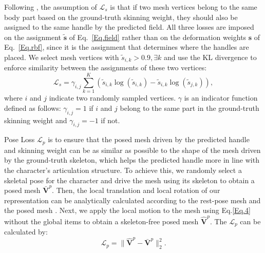 \documentclass[lettersize,journal]{IEEEtran}
\begin{document}
Following \cite{liao2022skeleton}, the assumption of $\mathcal{L}_s$ is that if two mesh vertices belong to the same body part based on the ground-truth skinning weight, they should also be assigned to the same handle by the predicted field. All three losses are imposed on the assignment $\tilde{\bm{s}}$ of Eq.~\ref{Eq.field} rather than on the deformation weights $\bm{s}$ of Eq.~\ref{Eq.rbf}, since it is the assignment that determines where the handles are placed. We select mesh vertices with $\tilde{s}_{i,k}>0.9, \exists k$ and use the KL divergence to enforce similarity between the assignments of these two vertices:
\begin{equation} \label{Eq.sup1}
\mathcal{L}_s = \gamma_{i,j} \sum_{k=1}^{K} \left( \tilde{s}_{i,k}\log(\tilde{s}_{i,k})-  \tilde{s}_{i,k}\log(\tilde{s}_{j,k})\right),
\end{equation}
where $i$ and $j$ indicate two randomly sampled vertices. $\gamma$ is an indicator function defined as follows: $\gamma_{i,j}=1$ if $i$ and $j$ belong to the same part in the ground-truth skinning weight and $\gamma_{i,j}=-1$ if not.

Pose Loss $\mathcal{L}_p$ is to ensure that the posed mesh driven by the predicted handle and skinning weight can be as similar as possible to the shape of the mesh driven by the ground-truth skeleton, which helps the predicted handle more in line with the character's articulation structure. To achieve this, we randomly select a skeletal pose for the character and drive the mesh using its skeleton to obtain a posed mesh $\bar{\bm{V}}^{p}$. Then, the local translation and local rotation of our representation can be analytically calculated according to the rest-pose mesh and the posed mesh \cite{besl1992method}. Next, we apply the local motion to the mesh using Eq.\ref{Eq.4} without the global items to obtain a skeleton-free posed mesh $\hat{\bm{V}}^{p}$. The $\mathcal{L}_p$ can be calculated by:
\begin{equation} \label{Eq.sup2}
\mathcal{L}_p = \lVert \hat{\bm{V}}^{p} - \bar{\bm{V}}^{p} \rVert_{2}^{2}.
\end{equation}
\end{document}
